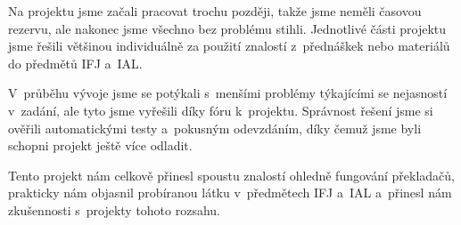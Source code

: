 \documentclass[a4paper, 11pt]{article}
\begin{document}
	Na projektu jsme začali pracovat trochu později, takže jsme neměli časovou rezervu, ale nakonec
	jsme všechno bez problému stihli. Jednotlivé části projektu jsme řešili většinou individuálně za použití
	znalostí z~přednáškek nebo materiálů do předmětů IFJ a~IAL.

	V~průběhu vývoje jsme se potýkali s~menšími problémy týkajícími se nejasností v~zadání, ale
	tyto jsme vyřešili díky fóru k~projektu. Správnost řešení jsme si ověřili automatickými
	testy a~pokusným odevzdáním, díky čemuž jsme byli schopni projekt ještě více odladit.

	Tento projekt nám celkově přinesl spoustu znalostí ohledně fungování překladačů, prakticky nám
	objasnil probíranou látku v~předmětech IFJ a~IAL a~přinesl nám zkušennosti s~projekty tohoto rozsahu.



	\clearpage
	
	\renewcommand{\refname}{Literatura}
	



	\clearpage
	\appendix
\end{document}
